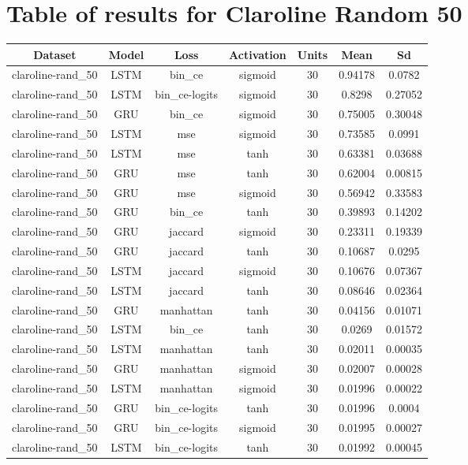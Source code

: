 \documentclass{article}%
\begin{document}
%
\newpage%
\section{Table of results for Claroline Random 50}%
\label{sec:TableofresultsforClarolineRandom50}%
\begin{longtable}{|c|c|c|c|c|c|c|}%
\hline%
\rowcolor{lightgray!70}%
\textbf{Dataset}&\textbf{Model}&\textbf{Loss}&\textbf{Activation}&\textbf{Units}&\textbf{Mean}&\textbf{Sd}\\%
\hline%
claroline{-}rand\_50&LSTM&bin\_ce&sigmoid&30&0.94178&0.0782\\%
\hline%
claroline{-}rand\_50&LSTM&bin\_ce{-}logits&sigmoid&30&0.8298&0.27052\\%
\hline%
claroline{-}rand\_50&GRU&bin\_ce&sigmoid&30&0.75005&0.30048\\%
\hline%
claroline{-}rand\_50&LSTM&mse&sigmoid&30&0.73585&0.0991\\%
\hline%
claroline{-}rand\_50&LSTM&mse&tanh&30&0.63381&0.03688\\%
\hline%
claroline{-}rand\_50&GRU&mse&tanh&30&0.62004&0.00815\\%
\hline%
claroline{-}rand\_50&GRU&mse&sigmoid&30&0.56942&0.33583\\%
\hline%
claroline{-}rand\_50&GRU&bin\_ce&tanh&30&0.39893&0.14202\\%
\hline%
claroline{-}rand\_50&GRU&jaccard&sigmoid&30&0.23311&0.19339\\%
\hline%
claroline{-}rand\_50&GRU&jaccard&tanh&30&0.10687&0.0295\\%
\hline%
claroline{-}rand\_50&LSTM&jaccard&sigmoid&30&0.10676&0.07367\\%
\hline%
claroline{-}rand\_50&LSTM&jaccard&tanh&30&0.08646&0.02364\\%
\hline%
claroline{-}rand\_50&GRU&manhattan&tanh&30&0.04156&0.01071\\%
\hline%
claroline{-}rand\_50&LSTM&bin\_ce&tanh&30&0.0269&0.01572\\%
\hline%
claroline{-}rand\_50&LSTM&manhattan&tanh&30&0.02011&0.00035\\%
\hline%
claroline{-}rand\_50&GRU&manhattan&sigmoid&30&0.02007&0.00028\\%
\hline%
claroline{-}rand\_50&LSTM&manhattan&sigmoid&30&0.01996&0.00022\\%
\hline%
claroline{-}rand\_50&GRU&bin\_ce{-}logits&tanh&30&0.01996&0.0004\\%
\hline%
claroline{-}rand\_50&GRU&bin\_ce{-}logits&sigmoid&30&0.01995&0.00027\\%
\hline%
claroline{-}rand\_50&LSTM&bin\_ce{-}logits&tanh&30&0.01992&0.00045\\%
\hline%
\end{longtable}

%
\newpage%
\end{document}
